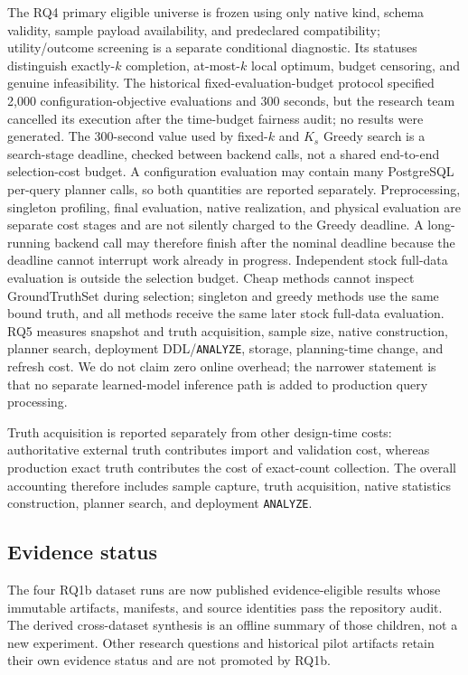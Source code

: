 The RQ4 primary eligible universe is frozen using only native kind, schema
validity, sample payload availability, and predeclared compatibility;
utility/outcome screening is a separate conditional diagnostic. Its statuses
distinguish exactly-$k$ completion, at-most-$k$ local optimum, budget
censoring, and genuine infeasibility. The historical fixed-evaluation-budget
protocol specified 2,000 configuration-objective evaluations and 300 seconds,
but the research team cancelled its execution after the time-budget fairness
audit; no results were generated. The 300-second value used by fixed-$k$ and
$K_s$ Greedy search is a search-stage deadline, checked between backend calls,
not a shared end-to-end selection-cost budget. A configuration evaluation may
contain many PostgreSQL per-query planner calls, so both quantities are
reported separately. Preprocessing, singleton profiling, final evaluation,
native realization, and physical evaluation are separate cost stages and are
not silently charged to the Greedy deadline. A long-running backend call may
therefore finish after the nominal deadline because the deadline cannot
interrupt work already in progress. Independent stock full-data evaluation is
outside the selection budget. Cheap methods cannot inspect GroundTruthSet
during selection; singleton and greedy methods use the same bound truth, and
all methods receive the same later stock full-data evaluation. RQ5 measures
snapshot and truth acquisition, sample size, native construction, planner
search, deployment DDL/\texttt{ANALYZE}, storage, planning-time change, and
refresh cost. We do not claim zero online overhead; the narrower statement is
that no separate learned-model inference path is added to production query
processing.

Truth acquisition is reported separately from other design-time costs:
authoritative external truth contributes import and validation cost, whereas
production exact truth contributes the cost of exact-count collection. The
overall accounting therefore includes sample capture, truth acquisition,
native statistics construction, planner search, and deployment \texttt{ANALYZE}.

\subsection{Evidence status}

The four RQ1b dataset runs are now published evidence-eligible results whose
immutable artifacts, manifests, and source identities pass the repository
audit. The derived cross-dataset synthesis is an offline summary of those
children, not a new experiment. Other research questions and historical pilot
artifacts retain their own evidence status and are not promoted by RQ1b.


